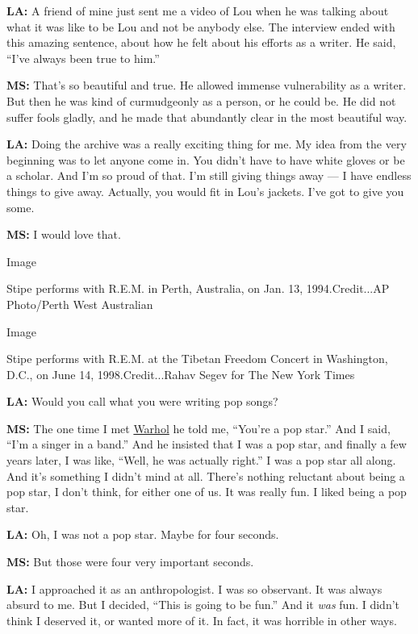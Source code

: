 \textbf{LA:} A friend of mine just sent me a video of Lou when he was
talking about what it was like to be Lou and not be anybody else. The
interview ended with this amazing sentence, about how he felt about his
efforts as a writer. He said, ``I've always been true to him.''

\textbf{MS:} That's so beautiful and true. He allowed immense
vulnerability as a writer. But then he was kind of curmudgeonly as a
person, or he could be. He did not suffer fools gladly, and he made that
abundantly clear in the most beautiful way.

\textbf{LA:} Doing the archive was a really exciting thing for me. My
idea from the very beginning was to let anyone come in. You didn't have
to have white gloves or be a scholar. And I'm so proud of that. I'm
still giving things away --- I have endless things to give away.
Actually, you would fit in Lou's jackets. I've got to give you some.

\textbf{MS:} I would love that.

Image

Stipe performs with R.E.M. in Perth, Australia, on Jan. 13,
1994.Credit...AP Photo/Perth West Australian

Image

Stipe performs with R.E.M. at the Tibetan Freedom Concert in Washington,
D.C., on June 14, 1998.Credit...Rahav Segev for The New York Times

\textbf{LA:} Would you call what you were writing pop songs?

\textbf{MS:} The one time I met
\href{https://www.nytimes3xbfgragh.onion/topic/person/andy-warhol}{Warhol}
he told me, ``You're a pop star.'' And I said, ``I'm a singer in a
band.'' And he insisted that I was a pop star, and finally a few years
later, I was like, ``Well, he was actually right.'' I was a pop star all
along. And it's something I didn't mind at all. There's nothing
reluctant about being a pop star, I don't think, for either one of us.
It was really fun. I liked being a pop star.

\textbf{LA:} Oh, I was not a pop star. Maybe for four seconds.

\textbf{MS:} But those were four very important seconds.

\textbf{LA:} I approached it as an anthropologist. I was so observant.
It was always absurd to me. But I decided, ``This is going to be fun.''
And it \emph{was} fun. I didn't think I deserved it, or wanted more of
it. In fact, it was horrible in other ways.

